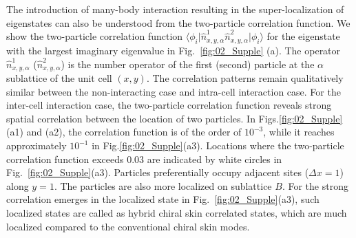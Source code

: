 \documentclass[longbibliography, aps, prx, amsmath, amssymb, amsfonts, twocolumn,superscriptaddress, footinbib]{revtex4-1}
\begin{document}
	
	The introduction of many-body interaction resulting in the super-localization of eigenstates can also be understood from the two-particle correlation function. 
	We show the two-particle correlation function $\langle \phi_i \vert \hat{n}^1_{x,y,\alpha} \hat{n}^2_{x,y,\alpha} \vert \phi_i \rangle$ for the eigenstate with the largest imaginary eigenvalue in Fig.~\ref{fig:02_Supple} (a). The operator $\hat{n}^1_{x,y,\alpha}$ ($\hat{n}^2_{x,y,\alpha}$) is the number operator of the first (second) particle at the $\alpha$ sublattice of the unit cell $(x,y)$.
	The correlation patterns remain qualitatively similar between the non-interacting case and intra-cell interaction case. 
	For the inter-cell interaction case, the two-particle correlation function reveals strong spatial correlation between the location of two particles. 
	In Figs.\ref{fig:02_Supple}(a1) and (a2), the correlation function is of the order of $10^{-3}$, while it reaches approximately $10^{-1}$ in Fig.\ref{fig:02_Supple}(a3). Locations where the two-particle correlation function exceeds $0.03$ are indicated by white circles in Fig.~\ref{fig:02_Supple}(a3).
	Particles preferentially occupy adjacent sites ($\Delta x =1$) along $y=1$.  The particles are also more localized on sublattice $B$. 
	For the strong correlation emerges in the localized state in Fig.~\ref{fig:02_Supple}(a3), such localized states are called as hybrid chiral skin correlated states, which are much localized compared to the conventional chiral skin modes.
\end{document}
